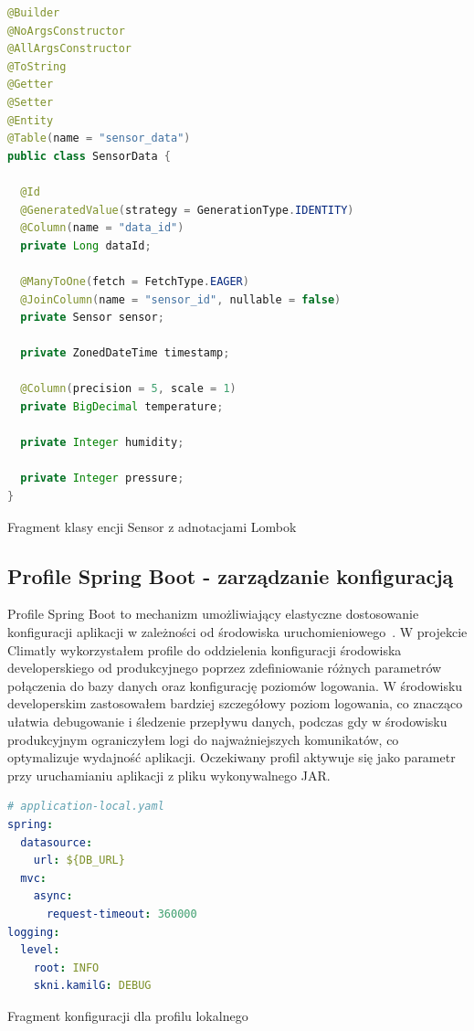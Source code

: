 \documentclass[a4paper,12pt,openany]{book}
\begin{document}
\begin{lstfloat}[htbp]
\begin{lstlisting}[language=java]
@Builder
@NoArgsConstructor
@AllArgsConstructor
@ToString
@Getter
@Setter
@Entity
@Table(name = "sensor_data")
public class SensorData {

  @Id
  @GeneratedValue(strategy = GenerationType.IDENTITY)
  @Column(name = "data_id")
  private Long dataId;

  @ManyToOne(fetch = FetchType.EAGER)
  @JoinColumn(name = "sensor_id", nullable = false)
  private Sensor sensor;

  private ZonedDateTime timestamp;

  @Column(precision = 5, scale = 1)
  private BigDecimal temperature;

  private Integer humidity;

  private Integer pressure;
}
\end{lstlisting}
\caption{Fragment klasy encji Sensor z adnotacjami Lombok}
\label{lst:lombok}
\end{lstfloat}
\vfill

\vspace{2cm}

\subsection*{Profile Spring Boot - zarządzanie konfiguracją}

Profile Spring Boot to mechanizm umożliwiający elastyczne dostosowanie konfiguracji aplikacji w zależności od środowiska uruchomieniowego~\cite{bib:baeldung2023profiles}. W projekcie Climatly wykorzystałem profile do oddzielenia konfiguracji środowiska developerskiego od produkcyjnego poprzez zdefiniowanie różnych parametrów połączenia do bazy danych oraz konfigurację poziomów logowania. W środowisku developerskim zastosowałem bardziej szczegółowy poziom logowania, co znacząco ułatwia debugowanie i śledzenie przepływu danych, podczas gdy w środowisku produkcyjnym ograniczyłem logi do najważniejszych komunikatów, co optymalizuje wydajność aplikacji. Oczekiwany profil aktywuje się jako parametr przy uruchamianiu aplikacji z pliku wykonywalnego JAR.

\begin{lstfloat}[H]
\begin{lstlisting}[language=yaml]
# application-local.yaml
spring:
  datasource:
    url: ${DB_URL}
  mvc:
    async:
      request-timeout: 360000
logging:
  level:
    root: INFO
    skni.kamilG: DEBUG
\end{lstlisting}
\caption{Fragment konfiguracji dla profilu lokalnego}
\label{lst:profile-local}
\end{lstfloat}
\end{document}
